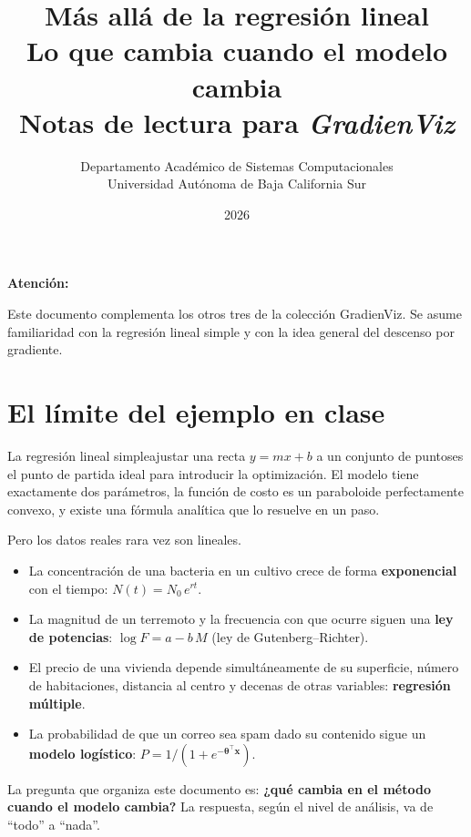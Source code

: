 \documentclass[12pt, a4paper]{article}
\title{
    {\Large\bfseries Más allá de la regresión lineal}\\[0.4em]
    {\large Lo que cambia cuando el modelo cambia}\\[0.8em]
    {\normalsize Notas de lectura para \textit{GradienViz}}
}
\author{
    Departamento Académico de Sistemas Computacionales\\
    Universidad Autónoma de Baja California Sur
}
\date{2026}
\newenvironment{vizadv}{%
    \begin{mdframed}[style=viznaranja]
    \textbf{\color{bordeadv}Atención:}\quad
}{%
    \end{mdframed}
}
\newcommand{\T}{{\top}}
\newcommand{\btheta}{\boldsymbol{\theta}}
\begin{document}
\maketitle
\tableofcontents
\vspace{1em}

\begin{vizadv}
Este documento complementa los otros tres de la colección GradienViz.
Se asume familiaridad con la regresión lineal simple y con la idea
general del descenso por gradiente.
\end{vizadv}

\section{El límite del ejemplo en clase}

La regresión lineal simple\textemdash ajustar una recta $y = mx + b$
a un conjunto de puntos\textemdash es el punto de partida ideal para
introducir la optimización. El modelo tiene exactamente dos parámetros,
la función de costo es un paraboloide perfectamente convexo, y existe
una fórmula analítica que lo resuelve en un paso.

Pero los datos reales rara vez son lineales.

\begin{itemize}
    \item La concentración de una bacteria en un cultivo crece de forma
    \textbf{exponencial} con el tiempo: $N(t) = N_0\,e^{rt}$.

    \item La magnitud de un terremoto y la frecuencia con que ocurre
    siguen una \textbf{ley de potencias}: $\log F = a - b\,M$
    (ley de Gutenberg--Richter).

    \item El precio de una vivienda depende simultáneamente de su
    superficie, número de habitaciones, distancia al centro y decenas
    de otras variables: \textbf{regresión múltiple}.

    \item La probabilidad de que un correo sea spam dado su contenido
    sigue un \textbf{modelo logístico}: $P = 1/(1 + e^{-\btheta^\T \mathbf{x}})$.
\end{itemize}

La pregunta que organiza este documento es: \textbf{¿qué cambia en el
método cuando el modelo cambia?} La respuesta, según el nivel de análisis,
va de ``todo'' a ``nada''.
\end{document}
